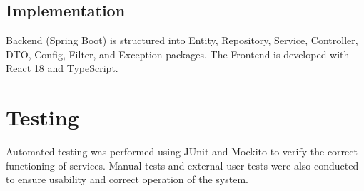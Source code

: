 \documentclass{report}
\begin{document}
\section{Implementation}
Backend (Spring Boot) is structured into Entity, Repository, Service, Controller, DTO, Config, Filter, and Exception packages. The Frontend is developed with React 18 and TypeScript.

\chapter{Testing}
Automated testing was performed using JUnit and Mockito to verify the correct functioning of services. Manual tests and external user tests were also conducted to ensure usability and correct operation of the system.
\end{document}

